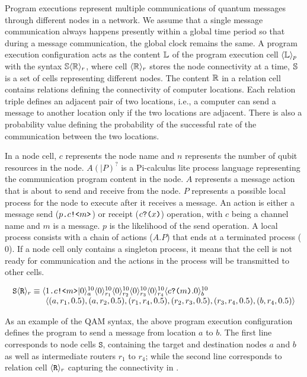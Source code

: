 Program executions represent multiple communications of quantum messages through different nodes in a network.
We assume that a single message communication always happens presently within a global time period so that during a message communication, the global clock remains the same.
A program execution configuration acts as the content $\mathbb{L}$ of the program execution cell $\langle \mathbb{L} \rangle_{p}$ with the syntax $\mathbb{S} \langle \mathbb{R} \rangle_r$, where cell $\langle \mathbb{R} \rangle_r$ stores the node connectivity at a time, $\mathbb{S}$ is a set of cells representing different nodes.
The content $\mathbb{R}$ in a relation cell contains relations defining the connectivity of computer locations.
Each relation triple defines an adjacent pair of two locations, i.e., 
a computer can send a message to another location only if the two locations are adjacent.
There is also a probability value defining the probability of the successful rate of the communication between the two locations.

In a node cell, $c$ represents the node name and $n$ represents the number of qubit resources in the node.
$A (\texttt{|} P )^?$ is a Pi-calculus lite process language representing the communication program content in the node.
$A$ represents a message action that is about to send and receive from the node. $P$ represents a possible local process for the node to execute after it receives a message.
An action is either a message send ($p\texttt{.}c\texttt{!<}m\texttt{>}$) or receipt ($c\texttt{?(}x\texttt{)}$) operation,
with $c$ being a channel name and $m$ is a message. $p$ is the likelihood of the send operation.
A local process consists with a chain of actions ($A.P$) that ends at a terminated process ($0$).
If a node cell only contains a singleton process,
it means that the cell is not ready for communication and the actions in the process will be transmitted to other cells.

{\small
\[
\begin{array}{l}
\texttt{S} \langle \texttt{R} \rangle_r \equiv 
\langle 1\texttt{.}c\texttt{!<}m\texttt{>}|0 \rangle^{10}_{a}\langle 0 \rangle^{10}_{r_1}\langle 0 \rangle^{10}_{r_2}\langle 0 \rangle^{10}_{r_3}\langle 0 \rangle^{10}_{r_4}\langle c\texttt{?(}m\texttt{)}.0 \rangle^{10}_{b} 
\\\qquad\qquad
\langle (a,r_1,0.5), (a,r_2,0.5), (r_1, r_4, 0.5), (r_2, r_3, 0.5), (r_3,r_4, 0.5), (b,r_4,0.5) \rangle 
\end{array}
\]
}

As an example of the QAM syntax, the above program execution configuration defines the program to send a message from location $a$ to $b$.
The first line corresponds to node cells $\texttt{S}$, containing the target and destination nodes $a$ and $b$ as well as intermediate routers $r_1$ to $r_4$; while the second line corresponds to relation cell $\langle \texttt{R} \rangle_r$ capturing the connectivity in .

